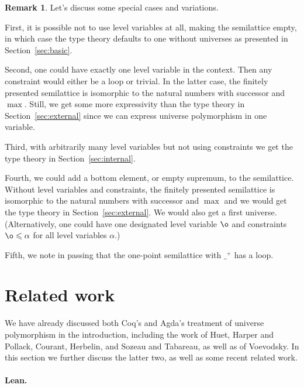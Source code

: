 \documentclass[11pt,a4paper]{article}
\theoremstyle{definition}
\newtheorem{remark}{Remark}
\begin{document}


\begin{remark}
Let's discuss some special cases and variations.

First, it is possible not to use
level variables at all, making the semilattice empty,
in which case the type theory defaults to one without universes
as presented in Section~\ref{sec:basic}.

Second, one could have exactly one level variable in the context.
Then any constraint would either be a loop or trivial.
In the latter case, the finitely presented semilattice
is isomorphic to the natural numbers with successor and $\max$.
Still, we get some more
expressivity than the type theory in Section~\ref{sec:external} since
we can express universe polymorphism in one variable.

Third, with arbitrarily many level variables but not using constraints
we get the type theory in Section~\ref{sec:internal}.

Fourth, we could add a bottom element, or empty supremum, to the semilattice.
Without level variables and constraints, the finitely presented semilattice
is isomorphic to the natural numbers with successor and $\max$
and we would get the type theory in Section~\ref{sec:external}.
We would also get a first universe.
(Alternatively, one could have one designated level variable
$\o$ and constraints $\o\leqslant\alpha$
for all level variables $\alpha$.)

Fifth, we note in passing that the one-point semilattice
with $\_^+$ has a loop.
\end{remark}

\section{Related work}\label{sec:related}

We have already discussed both Coq's and Agda's treatment of universe polymorphism in the introduction, including the work of Huet, Harper and Pollack, Courant, Herbelin, and Sozeau and Tabareau, as well as of Voevodsky. In this section we further
discuss the latter two, as well as some recent related work.

\paragraph{Lean.}
\end{document}
